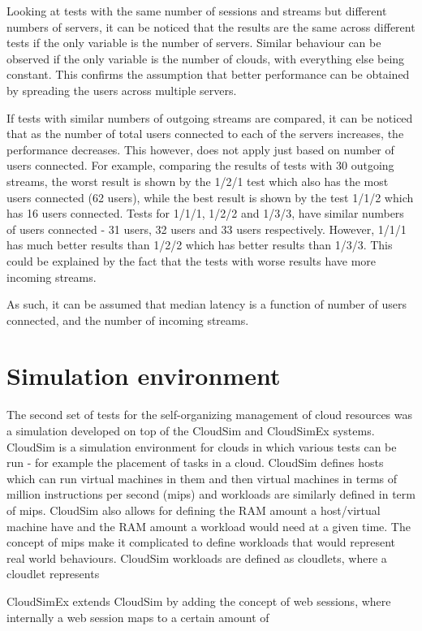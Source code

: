 Looking at tests with the same number of sessions and streams but different numbers of servers, it can be noticed that the results are the same across different tests if the only variable is the number of servers. Similar behaviour can be observed if the only variable is the number of clouds, with everything else being constant. This confirms the assumption that better performance can be obtained by spreading the users across multiple servers.

If tests with similar numbers of outgoing streams are compared, it can be noticed that as the number of total users connected to each of the servers increases, the performance decreases. This however, does not apply just based on number of users connected. For example, comparing the results of tests with 30 outgoing streams, the worst result is shown by the 1/2/1 test which also has the most users connected (62 users), while the best result is shown by the test 1/1/2 which has 16 users connected. Tests for 1/1/1, 1/2/2 and 1/3/3, have similar numbers of users connected - 31 users, 32 users and 33 users respectively. However, 1/1/1 has much better results than 1/2/2 which has better results than 1/3/3. This could be explained by the fact that the tests with worse results have more incoming streams.

As such, it can be assumed that median latency is a function of number of users connected, and the number of incoming streams.

\section{Simulation environment}

The second set of tests for the self-organizing management of cloud resources was a simulation developed on top of the CloudSim and CloudSimEx systems. CloudSim is a simulation environment for clouds in which various tests can be run - for example the placement of tasks in a cloud. CloudSim defines hosts which can run virtual machines in them and then virtual machines in terms of million instructions per second (mips) and workloads are similarly defined in term of mips. CloudSim also allows for defining the RAM amount a host/virtual machine have and the RAM amount a workload would need at a given time. The concept of mips make it complicated to define workloads that would represent real world behaviours. CloudSim workloads are defined as cloudlets, where a cloudlet represents 

CloudSimEx extends CloudSim by adding the concept of web sessions, where internally a web session maps to a certain amount of